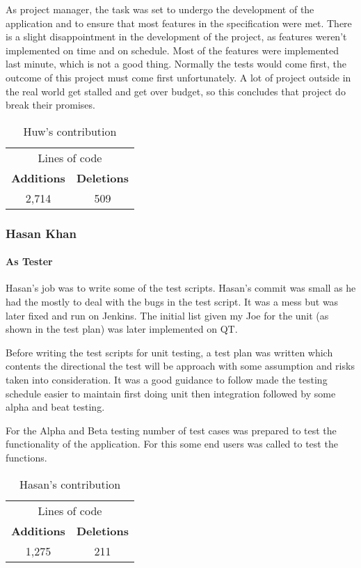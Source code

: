 \documentclass{unitemplate}
\begin{document}
As project manager, the task was set to undergo the development of the application and to ensure that most features in the specification were met. There is a slight disappointment in the development of the project, as features weren't implemented on time and on schedule. Most of the features were implemented last minute, which is not a good thing. Normally the tests would come first, the outcome of this project must come first unfortunately. A lot of project outside in the real world get stalled and get over budget, so this concludes that project do break their promises.

\begin{table}[h]
\centering
\begin{tabular}{c|c}
\multicolumn{2}{c}{Lines of code}\\
\textbf{Additions} & \textbf{Deletions} \\
2,714 & 509
\end{tabular}
\caption{Huw's contribution}
\label{tab:huwcon}
\end{table}

\subsubsection{Hasan Khan}

\paragraph{As Tester}
Hasan's job was to write some of the test scripts. Hasan's commit was small as he had the mostly to deal with the bugs in the test script. It was a mess but was later fixed and run on Jenkins. The initial list given my Joe for the unit (as shown in the test plan) was later implemented on QT. 

Before writing the test scripts for unit testing, a test plan was written which contents the directional the test will be approach with some assumption and risks taken into consideration. It was a good guidance to follow made the testing schedule easier to maintain first doing unit then integration followed by some alpha and beat testing.

For the Alpha and Beta testing number of test cases was prepared to test the functionality of the application. For this some end users was called to test the functions.


\begin{table}[h]
\centering
\begin{tabular}{c|c}
\multicolumn{2}{c}{Lines of code}\\
\textbf{Additions} & \textbf{Deletions} \\
1,275 & 211
\end{tabular}
\caption{Hasan's contribution}
\label{tab:hasancon}
\end{table}
\end{document}
